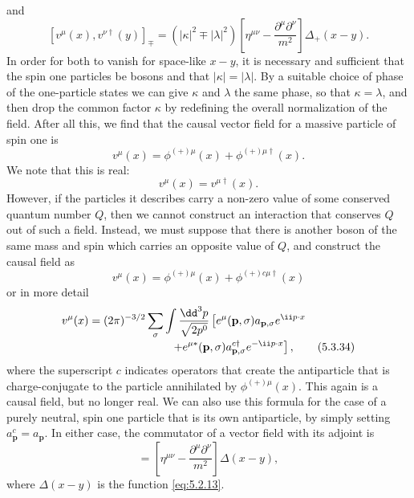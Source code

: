 and
\[
  [v^\mu(x),v^{\nu\dagger}(y)]_\mp
  =(|\kappa|^2\mp|\lambda|^2)
  \left[\eta^{\mu\nu}-\frac{\partial^\mu\partial^\nu}{m^2}\right]
  \Delta_+(x-y).
\]
In order for both to vanish for space-like $x-y$, it is necessary and
sufficient that the spin one particles be bosons and that
$|\kappa|=|\lambda|$. By a suitable choice of phase of the one-particle states
we can give $\kappa$ and $\lambda$ the same phase, so that $\kappa=\lambda$,
and then drop the common factor $\kappa$ by redefining the overall normalization
of the field. After all this, we find that the causal vector field for a
massive particle of spin one is
\begin{equation}
  v^\mu(x)=\phi^{(+)\mu}(x)+\phi^{(+)\mu\dagger}(x).
  \tag{5.3.31}\label{eq:5.3.31}
\end{equation}
We note that this is real:
\begin{equation}
  v^\mu(x)=v^{\mu\dagger}(x).
  \tag{5.3.32}\label{eq:5.3.32}
\end{equation}
However, if the particles it describes carry a non-zero value of some
conserved quantum number $Q$, then we cannot construct an interaction that
conserves $Q$ out of such a field. Instead, we must suppose that there is
another boson of the same mass and spin which carries an opposite value of
$Q$, and construct the causal field as
\begin{equation}
  v^\mu(x)=\phi^{(+)\mu}(x)+\phi^{(+)c\mu\dagger}(x)
  \tag{5.3.33}\label{eq:5.3.33}
\end{equation}
or in more detail
\begin{align}
  v^\mu(x)={}&(2\pi)^{-3/2}\sum_\sigma\int\frac{\dd^3p}{\sqrt{2p^0}}
  \left[e^\mu(\mathbf{p},\sigma)a_{\mathbf{p},\sigma}e^{\ii p\cdot x}
  \right.\notag\\[-2pt]
  &\left.\qquad\qquad\qquad
  +e^{\mu*}(\mathbf{p},\sigma)a^{c\dagger}_{\mathbf{p},\sigma}e^{-\ii p\cdot x}
  \right],
  \tag{5.3.34}\label{eq:5.3.34}
\end{align}
where the superscript $c$ indicates operators that create the antiparticle
that is charge-conjugate to the particle annihilated by $\phi^{(+)\mu}(x)$.
This again is a causal field, but no longer real. We can also use this formula
for the case of a purely neutral, spin one particle that is its own
antiparticle, by simply setting $a^c_{\mathbf{p}}=a_{\mathbf{p}}$. In either case,
the commutator of a vector field with its adjoint is
\begin{equation}
  [v^\mu(x),v^{\nu\dagger}(y)]
  =\left[\eta^{\mu\nu}-\frac{\partial^\mu\partial^\nu}{m^2}\right]
  \Delta(x-y),
  \tag{5.3.35}\label{eq:5.3.35}
\end{equation}
where $\Delta(x-y)$ is the function \eqref{eq:5.2.13}.

